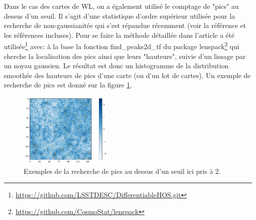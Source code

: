\documentclass[12pt,twoside]{article}
\begin{document}
Dans le cas des cartes de WL, on a également utilisé le comptage de "pics" au dessus d'un seuil. Il s'agit d'une statistique d'ordre supérieur utilisée pour la recherche de non-gaussianitée qui s'est répandue récemment (voir la référence \cite{2023arXiv230507531L} et les références incluses). Pour se faire la méthode détaillée dans l'article a été utilisée\footnote{\url{https://github.com/LSSTDESC/DifferentiableHOS.git}} avec: à la base la fonction \textsf{find\_peaks2d\_tf} du package \textsf{lenspack}\footnote{\url{https://github.com/CosmoStat/lenspack}} qui cherche la localisation des pics ainsi que leurs "hauteurs", suivie d'un lissage par un noyau gaussien. Le résultat est donc un histogramme de la distribution smoothée des hauteurs de pics d'une carte (ou d'un lot de cartes). Un exemple de recherche de pics est donné sur la figure \ref{fig-WL-peakcount-thr2-exemple}.
\begin{figure}
\centering
\includegraphics[width=0.4\textwidth]{fig-WL-peakcount-thr2-exemple.png}
\caption{Exemples de la recherche de pics au dessus d'un seuil ici pris à 2.}
\label{fig-WL-peakcount-thr2-exemple}
\end{figure}
%
\end{document}
